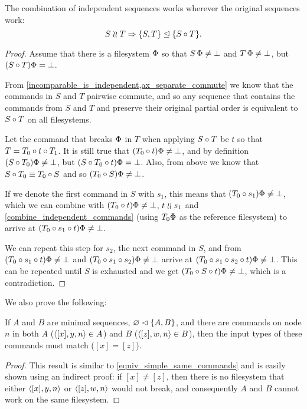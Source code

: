 \begin{mylem}\label{combine_independent_sequences}
The combination of independent sequences works wherever the original sequences work:
\[ S\mathrel{\wr\wr} T \Rightarrow {\{S,T\}}\trianglelefteq{\{S\circ T\}}. \]
\end{mylem}
\begin{proof}
Assume that there is a filesystem $\Phi$ so that
$S\,\Phi\neq\bot$ and $T\,\Phi\neq\bot$, but
$(S\circ T)\Phi=\bot$.

From \cref{incomparable_is_independent,ax_separate_commute} we know that
the commands in $S$ and $T$ pairwise commute, and so any sequence
that contains the commands from $S$ and $T$ and preserve their original partial order
is equivalent to $S\circ T$ on all filesystems.

Let the command that breaks $\Phi$ in $T$ when applying $S\circ T$ be $t$
so that $T=T_0\circ t\circ T_1$.
It is still true that $(T_0 \circ t)\Phi\neq\bot$,
and by definition $(S\circ T_0)\Phi\neq\bot$,
but $(S\circ T_0\circ t)\Phi=\bot$.
Also, from above we know that $S\circ T_0\equiv T_0\circ S$
and so $(T_0 \circ S)\Phi\neq\bot$.

If we denote the first command in $S$ with $s_1$,
this means that $(T_0 \circ s_1)\Phi\neq\bot$,
which we can combine with $(T_0 \circ t)\Phi\neq\bot$, $t\mathrel{\wr\wr} s_1$ and
\cref{combine_independent_commands}
(using $T_0\Phi$ as the reference filesystem)
to arrive at $(T_0 \circ s_1\circ t)\Phi\neq\bot$.

We can repeat this step for $s_2$, the next command in $S$,
and from 
$(T_0 \circ s_1\circ t)\Phi\neq\bot$
and
$(T_0 \circ s_1\circ s_2)\Phi\neq\bot$
arrive at
$(T_0 \circ s_1\circ s_2\circ t)\Phi\neq\bot$.
This can be repeated until $S$ is exhausted and we get
$(T_0 \circ S\circ t)\Phi\neq\bot$, which is a contradiction.
\end{proof}

We also prove the following:

\begin{mylem}\label{worksinputmatch}
If $A$ and $B$ are minimal sequences, ${\varnothing}\vartriangleleft{\{A,B\}}$,
and there are commands on node $n$ in both $A$ ($\langle{[x],y,n}\rangle\in A$) and $B$ ($\langle{[z],w,n}\rangle\in B$),
then the input types of these commands must match ($[x]=[z]$).
\end{mylem}
\begin{proof}
This result is similar to \cref{equiv_simple_same_commands} and
is easily shown using an indirect proof: if $[x]\neq [z]$, then there is no filesystem that
either $\langle{[x],y,n}\rangle$ or $\langle{[z],w,n}\rangle$ would not break, 
and consequently $A$ and $B$ cannot work on the same filesystem.
\end{proof}


